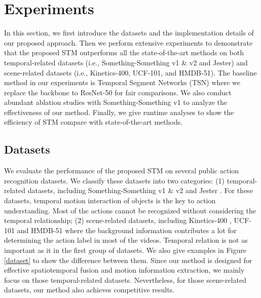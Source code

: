 \documentclass[10pt,twocolumn,letterpaper]{article}
\begin{document}
\section{Experiments}
	\label{exp}
	In this section, we first introduce the datasets and the implementation details of our proposed approach. Then we perform extensive experiments to demonstrate that the proposed STM outperforms all the state-of-the-art methods on both temporal-related datasets (i.e., Something-Something v1 \& v2 and Jester) and scene-related datasets (i.e., Kinetics-400, UCF-101, and HMDB-51). The baseline method in our experiments is Temporal Segment Networks (TSN) \cite{wang2016temporal} where we replace the backbone to ResNet-50 for fair comparisons. We also conduct abundant ablation studies with Something-Something v1 to analyze the effectiveness of our method. Finally, we give runtime analyses to show the efficiency of STM compare with state-of-the-art methods.
	
	\subsection{Datasets}
	We evaluate the performance of the proposed STM on several public action recognition datasets. We classify these datasets into two categories: (1) temporal-related datasets, including Something-Something v1 \& v2 \cite{goyal2017something} and Jester \cite{jester}. For these datasets, temporal motion interaction of objects is the key to action understanding. Most of the actions cannot be recognized without considering the temporal relationship; (2)
	scene-related datasets, including Kinetics-400 \cite{carreira2017quo}, UCF-101 \cite{soomro2012ucf101} and HMDB-51 \cite{Kuehne11} where the background information contributes a lot for determining the action label in most of the videos. Temporal relation is not as important as it in the first group of datasets. We also give examples in Figure \ref{dataset} to show the difference between them. Since our method is designed for effective spatiotemporal fusion and motion information extraction, we mainly focus on those temporal-related datasets. Nevertheless, for those scene-related datasets, our method also achieves competitive results.
\end{document}
